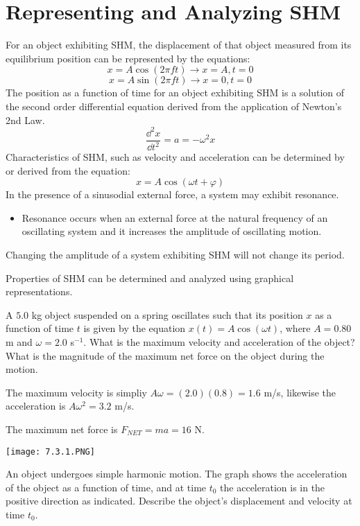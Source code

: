 \documentclass[../mech.tex]{subfiles}
\begin{document}
\section{Representing and Analyzing SHM}
For an object exhibiting SHM, the displacement of that object measured from its equilibrium position can be represented by the equations:
\[ x = A\cos (2\pi ft) \rightarrow x=A, t=0\]
\[ x=A\sin(2\pi ft)\rightarrow x=0, t=0\]
The position as a function of time for an object exhibiting SHM is a solution of the second order differential equation derived from the application of Newton's 2nd Law.
\[ \frac{\dd^2 x}{\dd t^2}=a=-\omega^2 x\]
Characteristics of SHM, such as velocity and acceleration can be determined by or derived from the equation:
\[ x=A\cos (\omega t + \varphi) \]
In the presence of a sinusodial external force, a system may exhibit resonance.
\begin{itemize}
    \item Resonance occurs when an external force at the natural frequency of an oscillating system and it increases the amplitude of oscillating motion.
\end{itemize}
Changing the amplitude of a system exhibiting SHM will not change its period.

Properties of SHM can be determined and analyzed using graphical representations.

\begin{example}
    A $5.0$ kg object suspended on a spring oscillates such that its position $x$ as a function of time $t$ is given by the equation $x(t)=A\cos (\omega t)$, where $A=0.80$ m and $\omega = 2.0$ s$^{-1}$. What is the 
    maximum velocity and acceleration of the object? What is the magnitude of the maximum net force on the object during the motion.

    The maximum velocity is simpliy $A\omega = (2.0)(0.8)=1.6$ m/s, likewise the acceleration is $A\omega^2 = 3.2$ m/s.

    The maximum net force is $F_{NET}=ma = 16$ N.
\end{example}

\pagebreak
\ex \begin{center}
    \texttt{[image: 7.3.1.PNG]}
\end{center}
An object undergoes simple harmonic motion. The graph shows the acceleration of the object as a function of time, and at time $t_0$ the acceleration is in the positive direction as indicated. Describe the object's displacement and velocity at time $t_0$.
\end{document}
